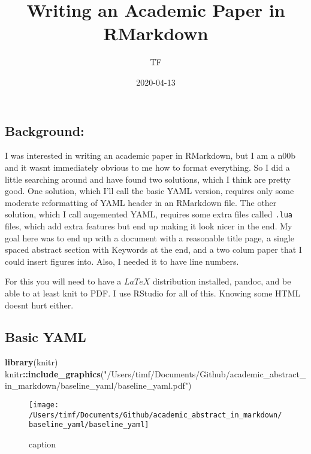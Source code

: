 \documentclass[
]{article}
\title{Writing an Academic Paper in RMarkdown}
\author{TF}
\date{2020-04-13}
\newenvironment{Shaded}{\begin{snugshade}}{\end{snugshade}}
\newcommand{\KeywordTok}[1]{\textcolor[rgb]{0.13,0.29,0.53}{\textbf{#1}}}
\newcommand{\NormalTok}[1]{#1}
\newcommand{\OperatorTok}[1]{\textcolor[rgb]{0.81,0.36,0.00}{\textbf{#1}}}
\newcommand{\StringTok}[1]{\textcolor[rgb]{0.31,0.60,0.02}{#1}}
\begin{document}
\maketitle

\hypertarget{background}{%
\subsection{Background:}\label{background}}

I was interested in writing an academic paper in RMarkdown, but I am a
n00b and it wasnt immediately obvious to me how to format everything. So
I did a little searching around and have found two solutions, which I
think are pretty good. One solution, which I'll call the basic YAML
version, requires only some moderate reformatting of YAML header in an
RMarkdown file. The other solution, which I call augemented YAML,
requires some extra files called \texttt{.lua} files, which add extra
features but end up making it look nicer in the end. My goal here was to
end up with a document with a reasonable title page, a single spaced
abstract section with Keywords at the end, and a two colum paper that I
could insert figures into. Also, I needed it to have line numbers.

For this you will need to have a \(LaTeX\) distribution installed,
pandoc, and be able to at least knit to PDF. I use RStudio for all of
this. Knowing some HTML doesnt hurt either.

\hypertarget{basic-yaml}{%
\subsection{Basic YAML}\label{basic-yaml}}

\begin{Shaded}
\begin{Highlighting}[]
\KeywordTok{library}\NormalTok{(knitr)}
\NormalTok{knitr}\OperatorTok{::}\KeywordTok{include\_graphics}\NormalTok{(}\StringTok{"/Users/timf/Documents/Github/academic\_abstract\_in\_markdown/baseline\_yaml/baseline\_yaml.pdf"}\NormalTok{)}
\end{Highlighting}
\end{Shaded}

\begin{figure}
\texttt{[image: /Users/timf/Documents/Github/academic\_abstract\_in\_markdown/baseline\_yaml/baseline\_yaml]} \caption{caption}\label{fig:label}
\end{figure}
\end{document}
